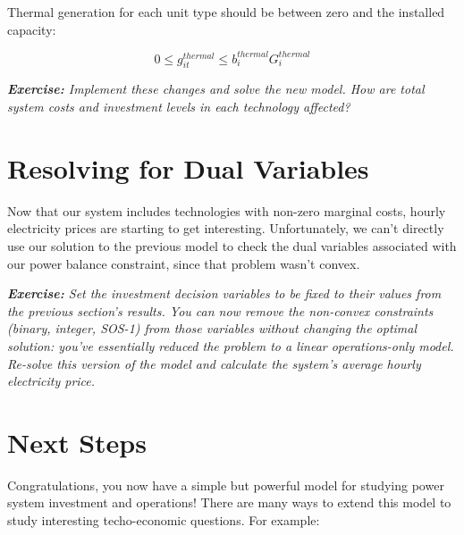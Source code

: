 \documentclass[11pt]{article}
\begin{document}
Thermal generation for each unit type should be between zero and the installed capacity:

\begin{equation}
	0 \leq g^{thermal}_{it} \leq b^{thermal}_i G^{thermal}_i
\end{equation}

\textit{\textbf{Exercise:} Implement these changes and solve the new model. How are total system costs and investment levels in each technology affected?}

\section{Resolving for Dual Variables}

Now that our system includes technologies with non-zero marginal costs, hourly electricity prices are starting to get interesting. Unfortunately, we can't directly use our solution to the previous model to check the dual variables associated with our power balance constraint, since that problem wasn't convex.

\textit{\textbf{Exercise:} Set the investment decision variables to be fixed to their values from the previous section's results. You can now remove the non-convex constraints (binary, integer, SOS-1) from those variables without changing the optimal solution: you've essentially reduced the problem to a linear operations-only model. Re-solve this version of the model and calculate the system's average hourly electricity price.}

\section{Next Steps}
Congratulations, you now have a simple but powerful model for studying power system investment and operations! There are many ways to extend this model to study interesting techo-economic questions. For example:
\end{document}
